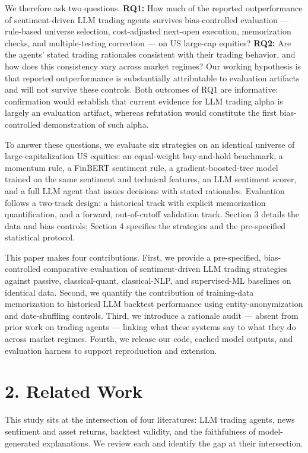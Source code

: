 \documentclass[
  12pt,
]{article}
\begin{document}
We therefore ask two questions. \textbf{RQ1:} How much of the reported
outperformance of sentiment-driven LLM trading agents survives
bias-controlled evaluation --- rule-based universe selection,
cost-adjusted next-open execution, memorization checks, and
multiple-testing correction --- on US large-cap equities? \textbf{RQ2:}
Are the agents' stated trading rationales consistent with their trading
behavior, and how does this consistency vary across market regimes? Our
working hypothesis is that reported outperformance is substantially
attributable to evaluation artifacts and will not survive these
controls. Both outcomes of RQ1 are informative: confirmation would
establish that current evidence for LLM trading alpha is largely an
evaluation artifact, whereas refutation would constitute the first
bias-controlled demonstration of such alpha.

To answer these questions, we evaluate six strategies on an identical
universe of large-capitalization US equities: an equal-weight
buy-and-hold benchmark, a momentum rule, a FinBERT sentiment rule, a
gradient-boosted-tree model trained on the same sentiment and technical
features, an LLM sentiment scorer, and a full LLM agent that issues
decisions with stated rationales. Evaluation follows a two-track design:
a historical track with explicit memorization quantification, and a
forward, out-of-cutoff validation track. Section 3 details the data and
bias controls; Section 4 specifies the strategies and the pre-specified
statistical protocol.

This paper makes four contributions. First, we provide a pre-specified,
bias-controlled comparative evaluation of sentiment-driven LLM trading
strategies against passive, classical-quant, classical-NLP, and
supervised-ML baselines on identical data. Second, we quantify the
contribution of training-data memorization to historical LLM backtest
performance using entity-anonymization and date-shuffling controls.
Third, we introduce a rationale audit --- absent from prior work on
trading agents --- linking what these systems say to what they do across
market regimes. Fourth, we release our code, cached model outputs, and
evaluation harness to support reproduction and extension.

\hypertarget{related-work}{%
\section{2. Related Work}\label{related-work}}

This study sits at the intersection of four literatures: LLM trading
agents, news sentiment and asset returns, backtest validity, and the
faithfulness of model-generated explanations. We review each and
identify the gap at their intersection.
\end{document}
